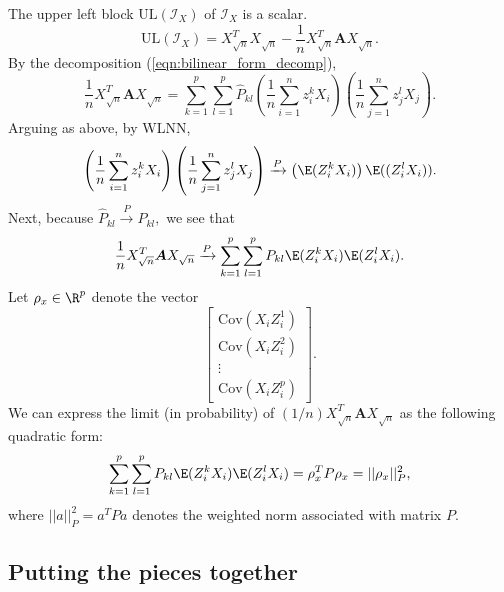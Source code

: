 \documentclass[12pt]{article}
\newcommand{\bs}[1]{\boldsymbol{#1}}
\newcommand{\infomat}{\bs{\mathcal{I}}}
\begin{document}
The upper left block $\textrm{UL}(\infomat_X)$ of $\infomat_X$ is a scalar. 
$$ \textrm{UL}(\infomat_X)  = X^T_{\sqrt{n}} X_{\sqrt{n}} - \frac{1}{n} X^T_{\sqrt{n}} \bs{A} X_{\sqrt{n}}.$$
By the decomposition (\ref{eqn:bilinear_form_decomp}),
$$
\frac{1}{n} X^T_{\sqrt{n}} \bs{A} X_{\sqrt{n}} = \sum_{k=1}^p \sum_{l=1}^p \hat{P}_{kl} \left(\frac{1}{n} \sum_{i=1}^n z_i^k X_i \right) \left(\frac{1}{n} \sum_{j=1}^n z_j^l X_j \right).
$$
Arguing as above, by WLNN,
$$ \left(\frac{1}{n} \sum_{i=1}^n z_i^k X_i \right) \left(\frac{1}{n} \sum_{j=1}^n z_j^l X_j \right) \xrightarrow{P} \left(\E(Z_i^k X_i)\right) \E((Z_i^l X_i)).$$ Next, because $\hat{P}_{kl} \xrightarrow{P} P_{kl},$ we see that
$$ \frac{1}{n} X^T_{\sqrt{n}} \bs{A} X_{\sqrt{n}} \xrightarrow{P} \sum_{k=1}^p \sum_{l=1}^p P_{kl} \E(Z^k_i X_i) \E(Z^l_i X_i).$$ Let $\rho_x \in \R^p$ denote the vector
$$\begin{bmatrix} \textrm{Cov}(X_i Z_i^1) \\ \textrm{Cov}(X_i Z_i^2) \\ \vdots \\ \textrm{Cov}(X_iZ_i^p) \end{bmatrix}.$$ We can express the limit (in probability) of $(1/n) X_{\sqrt{n}}^T \bs{A} X_{\sqrt{n}}$ as the following quadratic form:
$$ \sum_{k=1}^p \sum_{l=1}^p P_{kl} \E(Z^k_i X_i) \E(Z^l_i X_i) = \rho_x^TP\rho_x = ||\rho_x||_P^2,$$ where $|| a ||^2_P = a^TPa$ denotes the weighted norm associated with matrix $P$.

\subsection*{Putting the pieces together}
\end{document}
